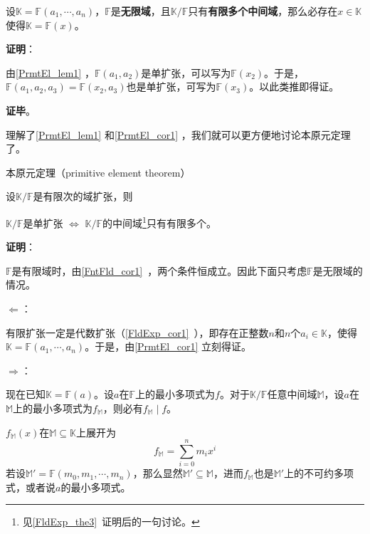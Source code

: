 \begin{corollary}{}\label{PrmtEl_cor1}
设$\mathbb{K}=\mathbb{F}(a_1, \cdots, a_n)$，$\mathbb{F}$是\textbf{无限域}，且$\mathbb{K}/\mathbb{F}$只有\textbf{有限多个中间域}，那么必存在$x\in\mathbb{K}$使得$\mathbb{K}=\mathbb{F}(x)$。
\end{corollary}

\textbf{证明}：

由\autoref{PrmtEl_lem1} ，$\mathbb{F}(a_1, a_2)$是单扩张，可以写为$\mathbb{F}(x_2)$。于是，$\mathbb{F}(a_1, a_2, a_3)=\mathbb{F}(x_2, a_3)$也是单扩张，可写为$\mathbb{F}(x_3)$。以此类推即得证。

\textbf{证毕}。


理解了\autoref{PrmtEl_lem1} 和\autoref{PrmtEl_cor1} ，我们就可以更方便地讨论本原元定理了。


\begin{theorem}{本原元定理（primitive element theorem）}\label{PrmtEl_the1}

设$\mathbb{K}/\mathbb{F}$是有限次的域扩张，则

$\mathbb{K}/\mathbb{F}$是单扩张 $\iff$ $\mathbb{K}/\mathbb{F}$的中间域\footnote{见\autoref{FldExp_the3}~证明后的一句讨论。}只有有限多个。

\end{theorem}

\textbf{证明}：

$\mathbb{F}$是有限域时，由\autoref{FntFld_cor1}~，两个条件恒成立。因此下面只考虑$\mathbb{F}$是无限域的情况。

$\Leftarrow$：

有限扩张一定是代数扩张（\autoref{FldExp_cor1}~），即存在正整数$n$和$n$个$a_i\in\mathbb{K}$，使得$\mathbb{K}=\mathbb{F}(a_1, \cdots, a_n)$。于是，由\autoref{PrmtEl_cor1} 立刻得证。

$\Rightarrow$：

现在已知$\mathbb{K}=\mathbb{F}(a)$。设$a$在$\mathbb{F}$上的最小多项式为$f$。对于$\mathbb{K}/\mathbb{F}$任意中间域$\mathbb{M}$，设$a$在$\mathbb{M}$上的最小多项式为$f_\mathbb{M}$，则必有$f_{\mathbb{M}}\mid f$。

$f_\mathbb{M}(x)$在$\mathbb{M}\subseteq\mathbb{K}$上展开为
\begin{equation}
f_\mathbb{M} = \sum_{i=0}^n m_ix^i
\end{equation}
若设$\mathbb{M}'=\mathbb{F}(m_0, m_1, \cdots, m_n)$，那么显然$\mathbb{M}'\subseteq\mathbb{M}$，进而$f_\mathbb{M}$也是$\mathbb{M}'$上的不可约多项式，或者说$a$的最小多项式。

